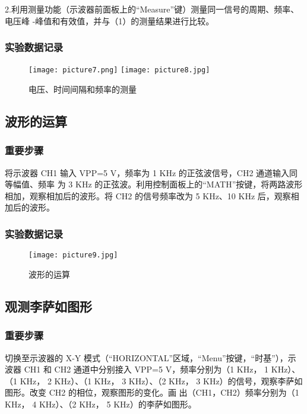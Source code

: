 \documentclass[11pt,a4paper]{article}
\begin{document}
2.利用测量功能（示波器前面板上的“Measure”键）测量同一信号的周期、频率、电压峰
-峰值和有效值，并与（1）的测量结果进行比较。
\subsubsection{实验数据记录}
\begin{figure}[H]
    \centering
    \texttt{[image: picture7.png]}
    \texttt{[image: picture8.jpg]}
    \caption{电压、时间间隔和频率的测量}
\end{figure}
\subsection{波形的运算}
    \subsubsection{重要步骤}
    将示波器 CH1 输入 VPP=5 V，频率为 1 KHz 的正弦波信号，CH2 通道输入同等幅值、频率
    为 3 KHz 的正弦波。利用控制面板上的“MATH”按键，将两路波形相加，观察相加后的波形。将
    CH2 的信号频率改为 5 KHz、10 KHz 后，观察相加后的波形。
    \subsubsection{实验数据记录}
    \begin{figure}[H]
        \centering
        \texttt{[image: picture9.jpg]}
        \caption{波形的运算}
    \end{figure}
\subsection{观测李萨如图形}
\subsubsection{重要步骤}
切换至示波器的 X-Y 模式（“HORIZONTAL”区域，“Menu”按键，“时基”），示波器 CH1 和
CH2 通道中分别接入 VPP=5 V，频率分别为（1 KHz， 1 KHz）、（1 KHz， 2 KHz）、（1 KHz，
3 KHz）、（2 KHz， 3 KHz）的信号，观察李萨如图形。改变 CH2 的相位，观察图形的变化。画
出（CH1，CH2）频率分别为（1 KHz， 4 KHz）、（2 KHz， 5 KHz）的李萨如图形。
\end{document}

